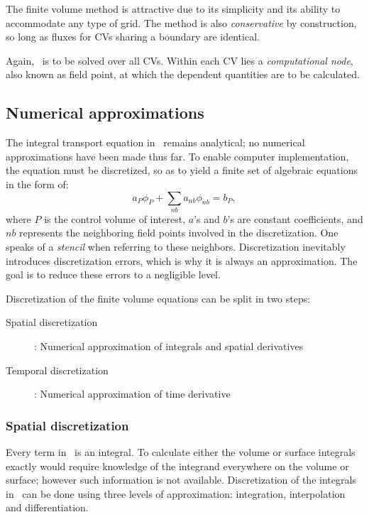 The finite volume method is attractive due to its simplicity and its ability to accommodate any type of grid. The method is also \textit{conservative} by construction, so long as fluxes for CVs sharing a boundary are identical.

Again,~ is to be solved over all CVs. Within each CV lies a \textit{computational node}, also known as field point, at which the dependent quantities are to be calculated.
%
%
\subsection{Numerical approximations}
\label{sec:fvnum}
%
%
The integral transport equation in~ remains analytical; no numerical approximations have been made thus far. To enable computer implementation, the equation must be discretized, so as to yield a finite set of algebraic equations in the form of:
\begin{equation*}
    a_P \phi_P + \sum_{nb}a_{nb}\phi_{nb} = b_P,
\end{equation*}
where $P$ is the control volume of interest, $a$'s and $b$'s are constant coefficients, and $nb$ represents the neighboring field points involved in the discretization. One speaks of a \textit{stencil} when referring to these neighbors. Discretization inevitably introduces discretization errors, which is why it is always an approximation. The goal is to reduce these errors to a negligible level.

Discretization of the finite volume equations can be split in two steps:
\begin{description}
    \item[Spatial discretization]: Numerical approximation of integrals and spatial derivatives
    \item[Temporal discretization]: Numerical approximation of time derivative
\end{description}

\subsubsection{Spatial discretization}
Every term in~ is an integral. To calculate either the volume or surface integrals exactly would require knowledge of the integrand everywhere on the volume or surface; however such information is not available. Discretization of the integrals in~ can be done using three levels of approximation: integration, interpolation and differentiation.

